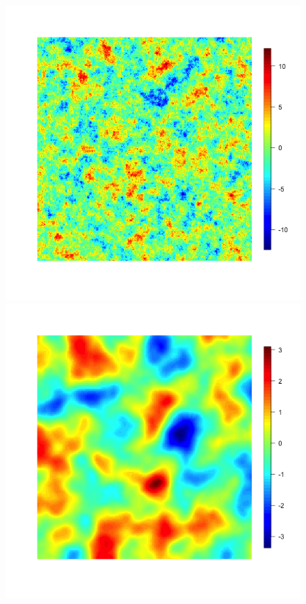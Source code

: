 \documentclass[11pt]{article}
\begin{document}
\begin{figure}
\includegraphics[scale = .35]{../simu_spatial3.png}
\includegraphics[scale = .35]{../simu_spatial4.png}


\end{figure}
\end{document}
